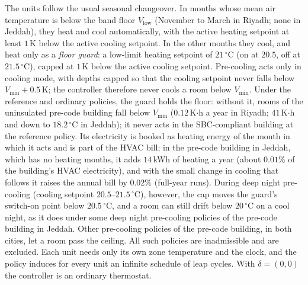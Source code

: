 \documentclass[10pt,a4paper,twocolumn]{article}
\theoremstyle{definition}
\newcommand{\hlGuardHeatJ}{14}
\newcommand{\hlGuardBillJ}{0.02}
\newcommand{\hlGuardHeatPctJ}{0.01}
\newcommand{\hlGuardColdR}{0.12}
\newcommand{\hlGuardColdJ}{41}
\newcommand{\hlGuardMinJ}{18.2}
\begin{document}
The units follow the usual seasonal changeover. In months whose mean air temperature is below the band floor $V_{\text{low}}$ (November to March in Riyadh; none in Jeddah), they heat and cool automatically, with the active heating setpoint at least $1\,$K below the active cooling setpoint. In the other months they cool, and heat only as a \emph{floor guard}: a low-limit heating setpoint of $21\,^{\circ}$C (on at $20.5$, off at $21.5\,^{\circ}$C), capped at $1\,$K below the active cooling setpoint. Pre-cooling acts only in cooling mode, with depths capped so that the cooling setpoint never falls below $V_{\min}+0.5\,$K; the controller therefore never cools a room below $V_{\min}$. Under the reference and ordinary policies, the guard holds the floor: without it, rooms of the uninsulated pre-code building fall below $V_{\min}$ ($\hlGuardColdR\,$K$\cdot$h a year in Riyadh; $\hlGuardColdJ\,$K$\cdot$h and down to $\hlGuardMinJ\,^{\circ}$C in Jeddah); it never acts in the SBC-compliant building at the reference policy. Its electricity is booked as heating energy of the month in which it acts and is part of the HVAC bill; in the pre-code building in Jeddah, which has no heating months, it adds $\hlGuardHeatJ\,$kWh of heating a year (about $\hlGuardHeatPctJ\%$ of the building's HVAC electricity), and with the small change in cooling that follows it raises the annual bill by $\hlGuardBillJ\%$ (full-year runs). During deep night pre-cooling (cooling setpoint $20.5$--$21.5\,^{\circ}$C), however, the cap moves the guard's switch-on point below $20.5\,^{\circ}$C, and a room can still drift below $20\,^{\circ}$C on a cool night, as it does under some deep night pre-cooling policies of the pre-code building in Jeddah. Other pre-cooling policies of the pre-code building, in both cities, let a room pass the ceiling. All such policies are inadmissible and are excluded. Each unit needs only its own zone temperature and the clock, and the policy induces for every unit an infinite schedule of leap cycles. With $\delta=(0,0)$ the controller is an ordinary thermostat.
\end{document}
